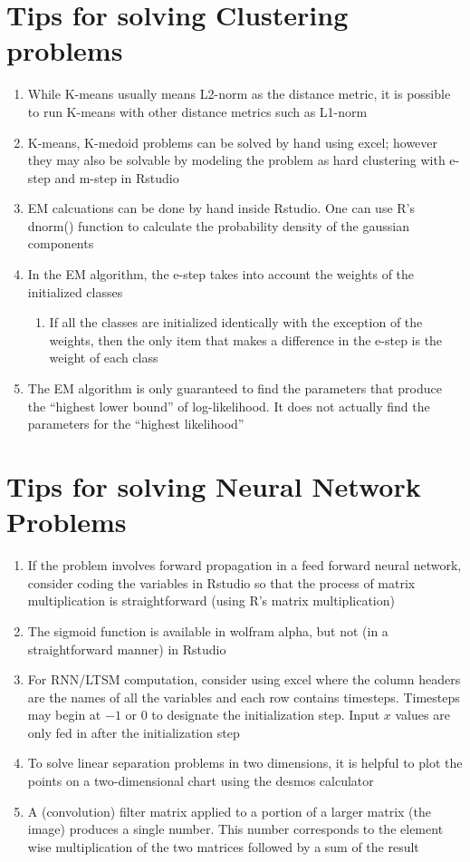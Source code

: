 \section {Tips for solving Clustering problems}
\begin {enumerate}
\item While K-means usually means L2-norm as the distance metric, it is possible to run K-means with other distance metrics such as L1-norm
\item K-means, K-medoid problems can be solved by hand using excel; however they may also be solvable by modeling the problem as hard clustering with e-step and m-step in Rstudio
\item EM calcuations can be done by hand inside Rstudio. One can use R's dnorm() function to calculate the probability density of the gaussian components
\item In the EM algorithm, the e-step takes into account the weights of the initialized classes
  \begin {enumerate}
  \item If all the classes are initialized identically with the exception of the weights, then the only item that makes a difference in the e-step is the weight of each class
  \end {enumerate}
\item The EM algorithm is only guaranteed to find the parameters that produce the ``highest lower bound'' of log-likelihood. It does not actually find the parameters for the ``highest likelihood''
\end {enumerate}

\section {Tips for solving Neural Network Problems}
\begin {enumerate}
\item If the problem involves forward propagation in a feed forward neural network, consider coding the variables in Rstudio so that the process of matrix multiplication is straightforward (using R's matrix multiplication)
\item The sigmoid function is available in wolfram alpha, but not (in a straightforward manner) in Rstudio
\item For RNN/LTSM computation, consider using excel where the column headers are the names of all the variables and each row contains timesteps. Timesteps may begin at $-1$ or $0$ to designate the initialization step. Input $x$ values are only fed in after the initialization step
\item To solve linear separation problems in two dimensions, it is helpful to plot the points on a two-dimensional chart using the desmos calculator
\item A (convolution) filter matrix applied to a portion of a larger matrix (the image) produces a single number. This number corresponds to the element wise multiplication of the two matrices followed by a sum of the result
\end {enumerate}


